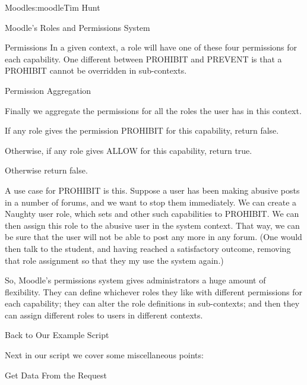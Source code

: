 \begin{aosachapter}{Moodle}{s:moodle}{Tim Hunt}
\begin{aosasect1}{Moodle's Roles and Permissions System}
\begin{aosasect2}{Permissions}
In a given context, a role will have one of these four permissions for
each capability. One different between PROHIBIT and PREVENT is that a
PROHIBIT cannot be overridden in sub-contexts.

\end{aosasect2}

\begin{aosasect2}{Permission Aggregation}

Finally we aggregate the permissions for all the roles the user has in
this context.

\begin{aosaitemize}

\item If any role gives the permission PROHIBIT for this capability,
  return false.

\item Otherwise, if any role gives ALLOW for this capability, return
  true.

\item Otherwise return false.

\end{aosaitemize}

A use case for PROHIBIT is this. Suppose a user has been making
abusive posts in a number of forums, and we want to stop them
immediately. We can create a Naughty user role, which sets
 and other such capabilities to PROHIBIT. We can
then assign this role to the abusive user in the system context. That
way, we can be sure that the user will not be able to post any more in
any forum. (One would then talk to the student, and having reached a
satisfactory outcome, removing that role assignment so that they my
use the system again.)

So, Moodle's permissions system gives administrators a huge amount of
flexibility. They can define whichever roles they like with different
permissions for each capability; they can alter the role definitions
in sub-contexts; and then they can assign different roles to users in
different contexts.

\end{aosasect2}

\end{aosasect1}

\begin{aosasect1}{Back to Our Example Script}

Next in our script we cover some miscellaneous points:

\begin{aosasect2}{Get Data From the Request}


\end{aosasect2}
\end{aosasect1}
\end{aosachapter}
